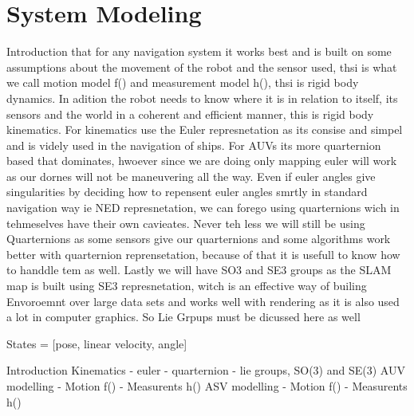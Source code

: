 \section{System Modeling}

Introduction that for any navigation system it works best and is built on some assumptions about the movement of the robot and the sensor used, thsi is what we call motion model f() and measurement model h(), thsi is rigid body dynamics. In adition the robot needs to know where it is in relation to itself, its sensors and the world in a coherent and efficient manner, this is rigid body kinematics.
For kinematics use the Euler represnetation as its consise and simpel and is videly used in the navigation of ships. For AUVs its more quarternion based that dominates, hwoever since we are doing only mapping euler will work as our dornes will not be maneuvering all the way. 
Even if euler angles give singularities by deciding how to repensent euler angles smrtly in standard navigation way ie NED represnetation, we can forego using quarternions wich in tehmeselves have their own cavieates. 
Never teh less we will still be using Quarternions as some sensors give our quarternions and some algorithms work better with quarternion reprensetation, because of that it is usefull to know how to handdle tem as well.
Lastly we will have SO3 and SE3 groups as the SLAM map is built using SE3 represnetation, witch is an effective way of builing Envoroemnt over large data sets and works well with rendering as it is also used a lot in computer graphics. So Lie Grpups must be dicussed here as well 

States = [pose, linear velocity, angle]

Introduction
Kinematics 
- euler
- quarternion
- lie groups, SO(3) and SE(3)
AUV modelling
- Motion f()
- Measurents h()
ASV modelling
- Motion f()
- Measurents h()

